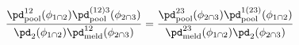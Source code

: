 \begin{equation}
  \frac {
    \pd_{\text{pool}}^{12}(\phi_{1 \cap 2})
    \pd_{\text{pool}}^{(12)3}(\phi_{2 \cap 3})
  } {
    \pd_{2}(\phi_{1 \cap 2}) 
    \pd_{\text{meld}}^{12}(\phi_{2 \cap 3})
  }
  =
  \frac {
    \pd_{\text{pool}}^{23}(\phi_{2 \cap 3})
    \pd_{\text{pool}}^{1(23)}(\phi_{1 \cap 2})
  } {
    \pd_{\text{meld}}^{23}(\phi_{1 \cap 2}) 
    \pd_{2}(\phi_{2 \cap 3})
  } 
  \label{eqn:commutativity-condition}
\end{equation}